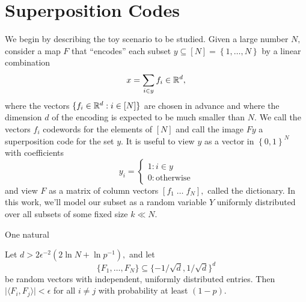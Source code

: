 \section{Superposition Codes \label{sec:codes}}

We begin by describing the toy scenario to be studied. Given a large number $N,$ consider a map $F$ that ``encodes'' each subset $y \subseteq [N] = \left\{ 1, \dots, N \right\}$ by a linear combination
$$
	x = \sum_{i \in y} f_i \in \mathbb{R}^d,
$$
where the vectors $\{ f_i \in \mathbb{R}^d : i \in [N] \}$ are chosen in advance and where the dimension $d$ of the encoding is expected to be much smaller than $N.$ We call the vectors $f_i$ codewords for the elements of $[N]$ and call the image $Fy$ a superposition code for the set $y.$ It is useful to view $y$ as a vector in $\left\{ 0, 1 \right\}^N$ with coefficients
$$
	y_i = \begin{cases}
		1: i \in y \\
		0 : \text{otherwise}
	\end{cases}
$$
and view $F$ as a matrix of column vectors $[f_1 \; \dots \; f_N],$ called the dictionary. In this work, we'll model our subset as a random variable $Y$ uniformly distributed over all subsets of some fixed size $k \ll N.$

One natural 

\begin{proposition}
	\label{prop:many-ortho}
	Let $d > 2 \epsilon^{-2} (2 \ln N + \ln p^{-1}),$ and let
	$$
		\{ F_1, \dots, F_N \} \subseteq \{ - 1/\sqrt d,  1 / \sqrt d \}^d
	$$
	be random vectors with independent, uniformly distributed entries. Then $\lvert \langle F_i, F_j \rangle \rvert < \epsilon$ for all $i \neq j$ with probability at least $(1 - p).$
\end{proposition}

